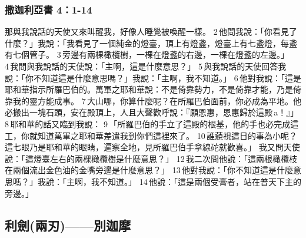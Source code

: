 \subsubsection{撒迦利亞書 4：1-14}
那與我說話的天使又來叫醒我，好像人睡覺被喚醒一樣。 2 他問我說：「你看見了什麼？」我說：「我看見了一個純金的燈臺，頂上有燈盞，燈臺上有七盞燈，每盞有七個管子。 3 旁邊有兩棵橄欖樹，一棵在燈盞的右邊，一棵在燈盞的左邊。」 4 我問與我說話的天使說：「主啊，這是什麼意思？」 5 與我說話的天使回答我說：「你不知道這是什麼意思嗎？」我說：「主啊，我不知道。」 6 他對我說：「這是耶和華指示所羅巴伯的。萬軍之耶和華說：不是倚靠勢力，不是倚靠才能，乃是倚靠我的靈方能成事。 7 大山哪，你算什麼呢？在所羅巴伯面前，你必成為平地。他必搬出一塊石頭，安在殿頂上，人且大聲歡呼說：『願恩惠，恩惠歸於這殿 a！』」 8 耶和華的話又臨到我說： 9 「所羅巴伯的手立了這殿的根基，他的手也必完成這工，你就知道萬軍之耶和華差遣我到你們這裡來了。 10 誰藐視這日的事為小呢？這七眼乃是耶和華的眼睛，遍察全地，見所羅巴伯手拿線砣就歡喜。」
我又問天使說：「這燈臺左右的兩棵橄欖樹是什麼意思？」 12 我二次問他說：「這兩根橄欖枝在兩個流出金色油的金嘴旁邊是什麼意思？」 13 他對我說：「你不知道這是什麼意思嗎？」我說：「主啊，我不知道。」 14 他說：「這是兩個受膏者，站在普天下主的旁邊。」






\subsection{利劍(兩刃)——別迦摩}

